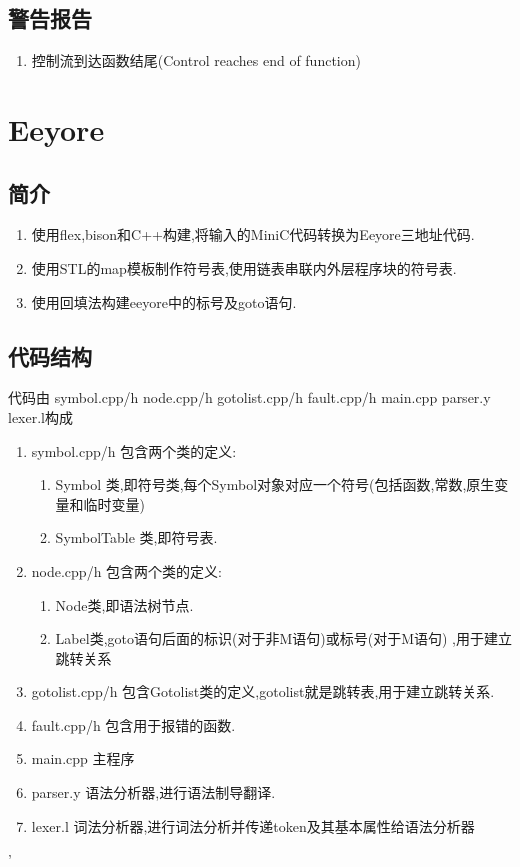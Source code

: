 \documentclass[UTF8]{article}
\begin{document}
\subsection{警告报告}
\begin{enumerate}
\item 控制流到达函数结尾(Control reaches end of function)
\end{enumerate}
\section{Eeyore}
\subsection{简介}
\begin{enumerate}
\item 使用flex,bison和C++构建,将输入的MiniC代码转换为Eeyore三地址代码.
\item 使用STL的map模板制作符号表,使用链表串联内外层程序块的符号表.
\item 使用回填法构建eeyore中的标号及goto语句.
\end{enumerate}
\subsection{代码结构}
代码由 symbol.cpp/h node.cpp/h gotolist.cpp/h fault.cpp/h main.cpp parser.y lexer.l构成
\begin{enumerate}
\item symbol.cpp/h 包含两个类的定义:
\begin{enumerate}[(1)]
\item Symbol 类,即符号类,每个Symbol对象对应一个符号(包括函数,常数,原生变量和临时变量)
\item SymbolTable 类,即符号表.
\end{enumerate}
\item node.cpp/h 包含两个类的定义:
\begin{enumerate}[(1)]
\item Node类,即语法树节点.
\item Label类,goto语句后面的标识(对于非M语句)或标号(对于M语句) ,用于建立跳转关系
\end{enumerate}
\item gotolist.cpp/h 包含Gotolist类的定义,gotolist就是跳转表,用于建立跳转关系.
\item fault.cpp/h 包含用于报错的函数.
\item main.cpp 主程序
\item parser.y 语法分析器,进行语法制导翻译.
\item lexer.l 词法分析器,进行词法分析并传递token及其基本属性给语法分析器
\end{enumerate}'
\end{document}
